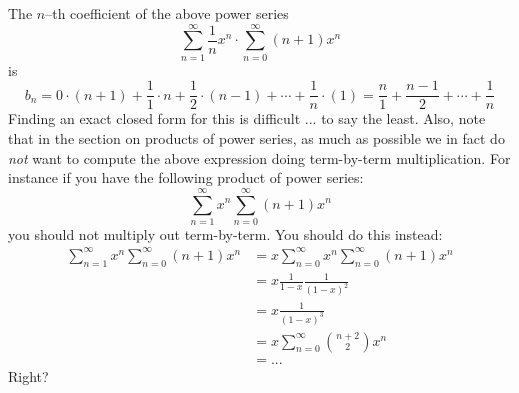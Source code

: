 The $n$--th coefficient of the above power series
\[
\sum_{n=1}^\infty \frac{1}{n} x^n  \cdot
\sum_{n=0}^\infty (n+1) x^n
\]
is
\[
b_n =
0 \cdot (n+1) + \frac{1}{1} \cdot n + \frac{1}{2} \cdot (n-1) +
\cdots + \frac{1}{n} \cdot (1)
= \frac{n}{1} + \frac{n-1}{2} + \cdots + \frac{1}{n}
\]
Finding an exact  closed form for this is difficult ... to say the least.
Also, note that in the section on products of power series,
as much as possible we in fact do \textit{not} want to compute the above expression
doing term-by-term multiplication.
For instance if you have the following product of power series:
\[
\sum_{n=1}^\infty x^n
\sum_{n=0}^\infty (n+1)x^n
\]
you should not multiply out term-by-term.
You should do this instead:
\begin{align*}
\sum_{n=1}^\infty x^n
\sum_{n=0}^\infty (n+1)x^n
&=
x\sum_{n=0}^\infty x^n
\sum_{n=0}^\infty (n+1)x^n
\\
&= x \frac{1}{1-x}\frac{1}{(1-x)^2} \\
&= x \frac{1}{(1-x)^3} \\
&= x \sum_{n=0}^\infty \binom{n+2}{2} x^n \\
&= ...
\end{align*}
Right?

